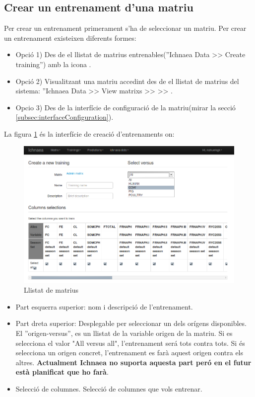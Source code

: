 \subsection{Crear un entrenament d'una matriu}
\label{subsec:createtraining}
Per crear un entrenament primerament s'ha de seleccionar un matriu. Per crear un entrenament existeixen diferents formes:
\begin{itemize} 
\item Opció 1) Des de el llistat de matrius entrenables(''Ichnaea Data >> Create training'') amb la icona \icontraining.
\item Opció 2) Visualitzant una matriu accedint des de el llistat de matrius del sistema: ''Ichnaea Data >> View matrixs >> \iconeyeopen >> \icontraining.
\item Opcio 3) Des de la interfície de configuració de la matriu(mirar la secció \ref{subsec:interfaceConfiguration}).
\end{itemize}

La figura \ref{fig:createTraining} \'{e}s la interfície de creació d'entrenaments on:
\begin{figure}[h!]
  \centering
  \includegraphics[scale=0.4]{img/userguide/training_create.png}
  \caption{Llistat de matrius}
  \label{fig:createTraining}
\end{figure}
\begin{itemize}
\item Part esquerra superior: nom i descripci\'{o} de l'entrenament.
\item Part dreta superior: Desplegable per seleccionar un dels orígens disponibles.  El ''origen-versus'', es un llistat de la variable origen de la matriu. Si es selecciona el valor "All versus all", l'entrenament ser\'{a} tots contra tots. Si \'{e}s selecciona un origen concret, l'entrenament es far\`{a} aquest origen contra els altres. \textbf{Actualment Ichnaea no suporta aquesta part per\'{o} en el futur est\`{a} planificat que ho far\`{a}}.
\item Selecci\'{o} de columnes. Selecci\'{o} de columnes que vols entrenar.
\end{itemize}

